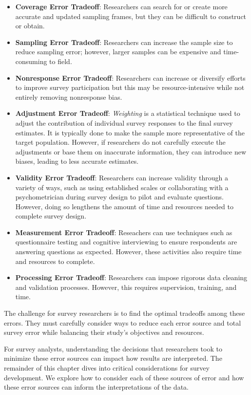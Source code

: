 \documentclass[
]{krantz}
\providecommand{\tightlist}{%
  \setlength{\itemsep}{0pt}\setlength{\parskip}{0pt}}
\begin{document}
\begin{itemize}
\tightlist
\item
  \textbf{Coverage Error Tradeoff}: Researchers can search for or create more accurate and updated sampling frames, but they can be difficult to construct or obtain.
\item
  \textbf{Sampling Error Tradeoff}: Researchers can increase the sample size to reduce sampling error; however, larger samples can be expensive and time-consuming to field.
\item
  \textbf{Nonresponse Error Tradeoff}: Researchers can increase or diversify efforts to improve survey participation but this may be resource-intensive while not entirely removing nonresponse bias.
\item
  \textbf{Adjustment Error Tradeoff}: \emph{Weighting} is a statistical technique used to adjust the contribution of individual survey responses to the final survey estimates. It is typically done to make the sample more representative of the target population. However, if researchers do not carefully execute the adjustments or base them on inaccurate information, they can introduce new biases, leading to less accurate estimates.
\item
  \textbf{Validity Error Tradeoff}: Researchers can increase validity through a variety of ways, such as using established scales or collaborating with a psychometrician during survey design to pilot and evaluate questions. However, doing so lengthens the amount of time and resources needed to complete survey design.
\item
  \textbf{Measurement Error Tradeoff}: Reseachers can use techniques such as questionnaire testing and cognitive interviewing to ensure respondents are answering questions as expected. However, these activities also require time and resources to complete.
\item
  \textbf{Processing Error Tradeoff}: Researchers can impose rigorous data cleaning and validation processes. However, this requires supervision, training, and time.
\end{itemize}

The challenge for survey researchers is to find the optimal tradeoffs among these errors. They must carefully consider ways to reduce each error source and total survey error while balancing their study's objectives and resources.

For survey analysts, understanding the decisions that researchers took to minimize these error sources can impact how results are interpreted. The remainder of this chapter dives into critical considerations for survey development. We explore how to consider each of these sources of error and how these error sources can inform the interpretations of the data.
\end{document}
